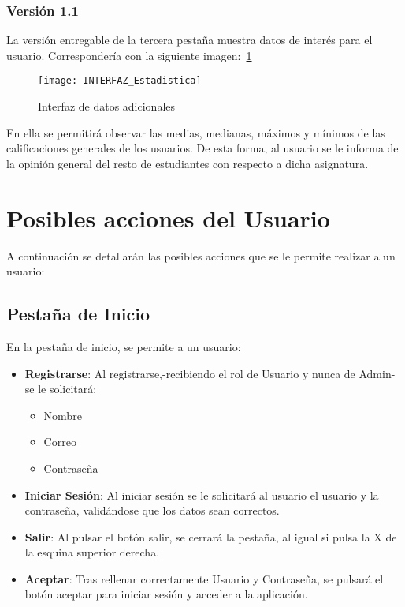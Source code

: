 \subsubsection{Versión 1.1}
La versión entregable de la tercera pestaña muestra datos de interés para el usuario. Correspondería con la siguiente imagen:~\ref{fig:C.3.4.1}
\begin{figure}[h]
\centering
\texttt{[image: INTERFAZ\_Estadistica]}
\caption{Interfaz de datos adicionales}
\label{fig:C.3.4.1}
\end{figure} 
En ella se permitirá observar las medias, medianas, máximos y mínimos de las calificaciones generales de los usuarios. De esta forma, al usuario se le informa de la opinión general del resto de estudiantes con respecto a dicha asignatura. 
\section{Posibles acciones del Usuario}
A continuación se detallarán las posibles acciones que se le permite realizar a un usuario: 
\subsection{Pestaña de Inicio}
En la pestaña de inicio, se permite a un usuario: 
\begin{itemize}
\item \textbf{Registrarse}: Al registrarse,-recibiendo el rol de Usuario y nunca de Admin- se le solicitará: 
\begin{itemize}
\item Nombre
\item Correo
\item Contraseña
\end{itemize}	

\item \textbf{Iniciar Sesión}: Al iniciar sesión se le solicitará  al usuario el usuario y la contraseña, validándose que los datos sean correctos.
\item \textbf{Salir}: Al pulsar el botón salir, se cerrará la pestaña, al igual si pulsa la X de la esquina superior derecha. 
\item \textbf{Aceptar}: Tras rellenar correctamente Usuario y Contraseña, se pulsará el botón aceptar para iniciar sesión y acceder a la aplicación. 
\end{itemize}


